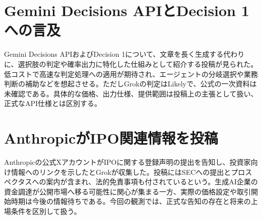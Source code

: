 \section{Gemini Decisions APIとDecision 1への言及}
Gemini Decisions APIおよびDecision 1について、文章を長く生成する代わりに、選択肢の判定や確率出力に特化した仕組みとして紹介する投稿が見られた。低コストで高速な判定処理への適用が期待され、エージェントの分岐選択や業務判断の補助などを想起させる。ただしGrokの判定はLikelyで、公式の一次資料は未確認である。具体的な価格、出力仕様、提供範囲は投稿上の主張として扱い、正式なAPI仕様とは区別する。

\section{AnthropicがIPO関連情報を投稿}
Anthropicの公式XアカウントがIPOに関する登録声明の提出を告知し、投資家向け情報へのリンクを示したとGrokが収集した。投稿にはSECへの提出とプロスペクタスへの案内が含まれ、法的免責事項も付されているという。生成AI企業の資金調達が公開市場へ移る可能性に関心が集まる一方、実際の価格設定や取引開始時期は今後の情報待ちである。今回の観測では、正式な告知の存在と将来の上場条件を区別して扱う。
